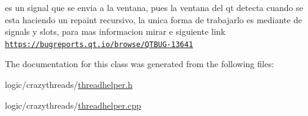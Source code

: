 es un signal que se envia a la ventana, pues la ventana del qt detecta cuando se esta haciendo un repaint recursivo, la unica forma de trabajarlo es mediante de signals y slots, para mas informacion mirar e siguiente link \href{https://bugreports.qt.io/browse/QTBUG-13641}{\tt https\-://bugreports.\-qt.\-io/browse/\-Q\-T\-B\-U\-G-\/13641} 



The documentation for this class was generated from the following files\-:\begin{DoxyCompactItemize}
\item 
logic/crazythreads/\hyperlink{threadhelper_8h}{threadhelper.\-h}\item 
logic/crazythreads/\hyperlink{threadhelper_8cpp}{threadhelper.\-cpp}\end{DoxyCompactItemize}

